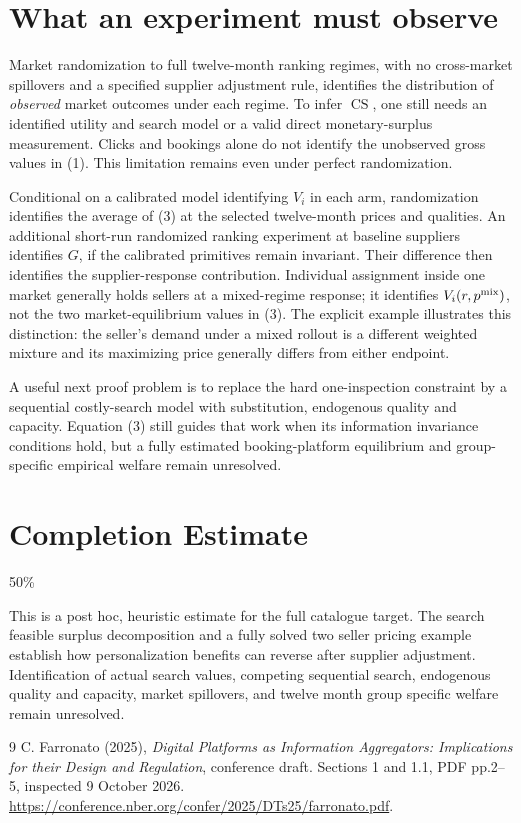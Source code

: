 \documentclass[11pt]{article}
\theoremstyle{remark}
\newcommand{\CS}{\operatorname{CS}}
\begin{document}
\section{What an experiment must observe}
Market randomization to full twelve-month ranking regimes, with no cross-market spillovers and a specified supplier adjustment rule, identifies the distribution of \emph{observed} market outcomes under each regime. To infer $\CS$, one still needs an identified utility and search model or a valid direct monetary-surplus measurement. Clicks and bookings alone do not identify the unobserved gross values in (1). This limitation remains even under perfect randomization.

Conditional on a calibrated model identifying $V_i$ in each arm, randomization identifies the average of (3) at the selected twelve-month prices and qualities. An additional short-run randomized ranking experiment at baseline suppliers identifies $G$, if the calibrated primitives remain invariant. Their difference then identifies the supplier-response contribution. Individual assignment inside one market generally holds sellers at a mixed-regime response; it identifies $V_i(r,p^{\rm mix})$, not the two market-equilibrium values in (3). The explicit example illustrates this distinction: the seller's demand under a mixed rollout is a different weighted mixture and its maximizing price generally differs from either endpoint.

A useful next proof problem is to replace the hard one-inspection constraint by a sequential costly-search model with substitution, endogenous quality and capacity. Equation (3) still guides that work when its information invariance conditions hold, but a fully estimated booking-platform equilibrium and group-specific empirical welfare remain unresolved.

\section{Completion Estimate}
50\%

This is a post hoc, heuristic estimate for the full catalogue target.
The search feasible surplus decomposition and a fully solved two seller pricing example establish how personalization benefits can reverse after supplier adjustment. Identification of actual search values, competing sequential search, endogenous quality and capacity, market spillovers, and twelve month group specific welfare remain unresolved.

\begin{thebibliography}{9}
 C. Farronato (2025), \emph{Digital Platforms as Information Aggregators: Implications for their Design and Regulation}, conference draft. Sections 1 and 1.1, PDF pp.2--5, inspected 9 October 2026. \url{https://conference.nber.org/confer/2025/DTs25/farronato.pdf}.
\end{thebibliography}
\end{document}
